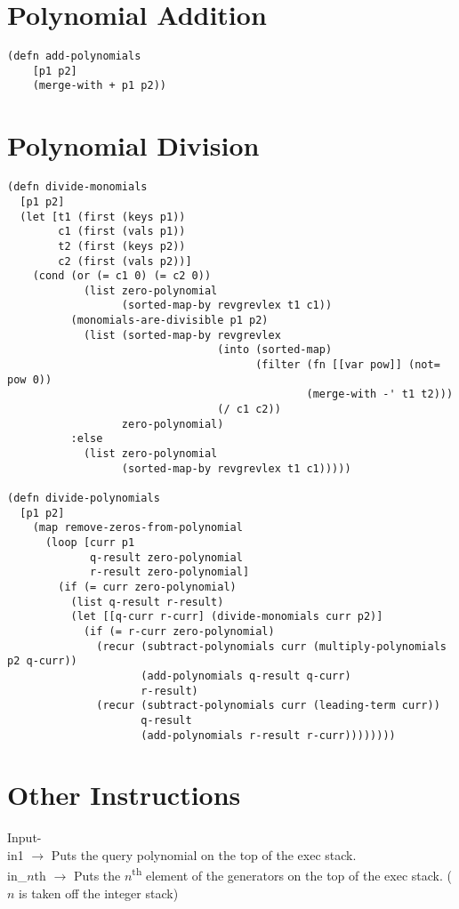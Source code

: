 \documentclass[20pt]{extarticle}
\begin{document}
\newpage
\section*{Polynomial Addition}
\begin{verbatim}
(defn add-polynomials
    [p1 p2]
    (merge-with + p1 p2))
\end{verbatim}

\newpage
\section*{Polynomial Division}
{\tiny
\begin{verbatim}
(defn divide-monomials
  [p1 p2]
  (let [t1 (first (keys p1))
        c1 (first (vals p1))
        t2 (first (keys p2))
        c2 (first (vals p2))]
    (cond (or (= c1 0) (= c2 0))
            (list zero-polynomial
                  (sorted-map-by revgrevlex t1 c1))
          (monomials-are-divisible p1 p2)
            (list (sorted-map-by revgrevlex
                                 (into (sorted-map)
                                       (filter (fn [[var pow]] (not= pow 0))
                                               (merge-with -' t1 t2)))
                                 (/ c1 c2))
                  zero-polynomial)
          :else
            (list zero-polynomial
                  (sorted-map-by revgrevlex t1 c1)))))

(defn divide-polynomials
  [p1 p2]
    (map remove-zeros-from-polynomial
      (loop [curr p1
             q-result zero-polynomial
             r-result zero-polynomial]
        (if (= curr zero-polynomial)
          (list q-result r-result)
          (let [[q-curr r-curr] (divide-monomials curr p2)]
            (if (= r-curr zero-polynomial)
              (recur (subtract-polynomials curr (multiply-polynomials p2 q-curr))
                     (add-polynomials q-result q-curr)
                     r-result)
              (recur (subtract-polynomials curr (leading-term curr))
                     q-result
                     (add-polynomials r-result r-curr))))))))
\end{verbatim}
}

\newpage
\section*{Other Instructions}

\noindent Input- \\
\indent in1 $\rightarrow$ Puts the query polynomial on the top of the exec stack. \\
\indent in\_$n$th $\rightarrow$ Puts the $n$\textsuperscript{th} element of the generators on the top of the exec stack. ($n$ is taken off the integer stack) \\
\end{document}

